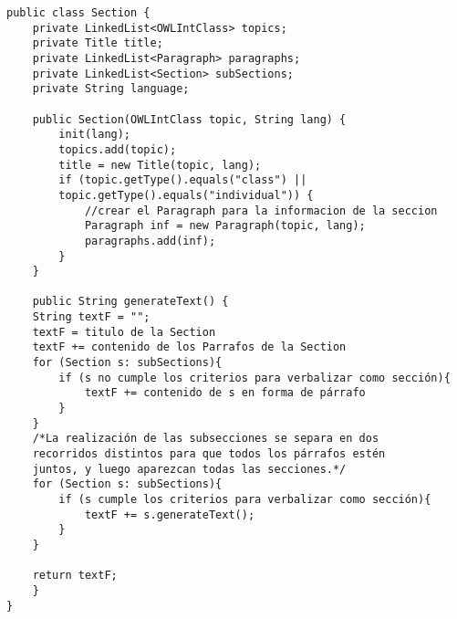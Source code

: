 \begin{verbatim}
public class Section {
    private LinkedList<OWLIntClass> topics;
    private Title title;
    private LinkedList<Paragraph> paragraphs;
    private LinkedList<Section> subSections;
    private String language;

    public Section(OWLIntClass topic, String lang) {
        init(lang);
        topics.add(topic);
        title = new Title(topic, lang);
        if (topic.getType().equals("class") ||
        topic.getType().equals("individual")) {
            //crear el Paragraph para la informacion de la seccion
            Paragraph inf = new Paragraph(topic, lang);
            paragraphs.add(inf);
        } 
    }
    
    public String generateText() {
    String textF = "";
    textF = titulo de la Section
    textF += contenido de los Parrafos de la Section
    for (Section s: subSections){
        if (s no cumple los criterios para verbalizar como sección){
            textF += contenido de s en forma de párrafo
        }
    }
    /*La realización de las subsecciones se separa en dos
    recorridos distintos para que todos los párrafos estén
    juntos, y luego aparezcan todas las secciones.*/
    for (Section s: subSections){
        if (s cumple los criterios para verbalizar como sección){
            textF += s.generateText();
        }
    }
    
    return textF;
    }
}
\end{verbatim}

